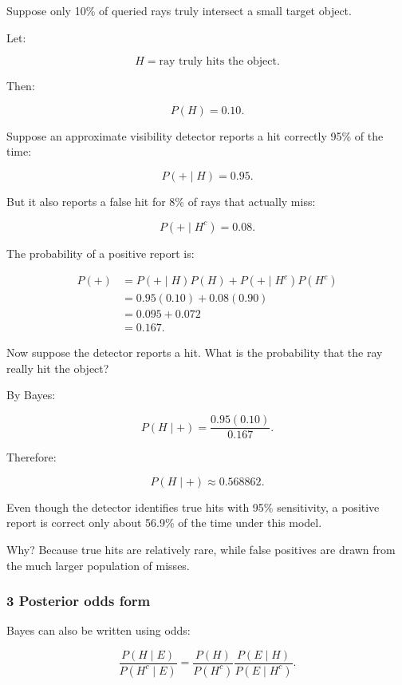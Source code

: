 \hypertarget{02-foundations-ii-ch023-worked-graphics-example-a-noisy-visibility-detector}{}

Suppose only 10\% of queried rays truly intersect a small target object.

Let:

\[
 H=\text{ray truly hits the object}.
\]

Then:

\[
 P(H)=0.10.
\]

Suppose an approximate visibility detector reports a hit correctly 95\% of the time:

\[
 P(+\mid H)=0.95.
\]

But it also reports a false hit for 8\% of rays that actually miss:

\[
 P(+\mid H^c)=0.08.
\]

The probability of a positive report is:

\[
 \begin{aligned} P(+) &=P(+\mid H)P(H) +P(+\mid H^c)P(H^c)\\ &=0.95(0.10)+0.08(0.90)\\ &=0.095+0.072\\ &=\boxed{0.167}. \end{aligned}
\]

Now suppose the detector reports a hit. What is the probability that the ray really hit the object?

By Bayes:

\[
 P(H\mid+) = \frac{0.95(0.10)}{0.167}.
\]

Therefore:

\[
 \boxed{ P(H\mid+)\approx0.568862 }.
\]

Even though the detector identifies true hits with 95\% sensitivity, a positive report is correct only about 56.9\% of the time under this model.

Why? Because true hits are relatively rare, while false positives are drawn from the much larger population of misses.

\subsubsection{3 Posterior odds form}\label{02-foundations-ii-ch023-posterior-odds-form}

\hypertarget{02-foundations-ii-ch023-posterior-odds-form}{}

Bayes can also be written using odds:

\[
 \frac{P(H\mid E)}{P(H^c\mid E)} = \frac{P(H)}{P(H^c)} \frac{P(E\mid H)}{P(E\mid H^c)}.
\]

